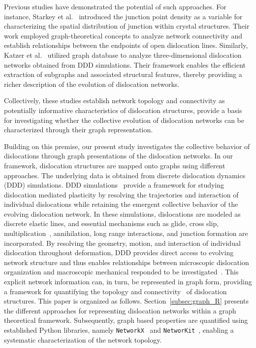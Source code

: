 \documentclass[pdflatex,sn-mathphys-num]{sn-jnl}%
\theoremstyle{thmstyleone}%
\theoremstyle{thmstyletwo}%
\theoremstyle{thmstylethree}%
\begin{document}
Previous studies have demonstrated the potential of such approaches. For instance, Starkey et al.~\cite{STARKEY2022} introduced the junction point density as a variable for characterizing the spatial distribution of junction within crystal structures. Their work employed graph-theoretical concepts to analyze network connectivity and establish relationships between the endpoints of open dislocation lines.
Similarly, Katzer et al.~\cite{KATZER2024115841} utilized graph database to analyze three-dimensional dislocation networks obtained from DDD simulations. Their framework enables the efficient extraction of subgraphs and associated structural features, thereby providing a richer description of the evolution of dislocation networks.

Collectively, these studies establish network topology and connectivity as potentially informative characteristics of dislocation structures, provide a basis for investigating whether the collective evolution of dislocation networks can be characterized through their graph representation. 

Building on this premise, our present study investigates the collective behavior of dislocations through graph presentations of the dislocation networks.
In our framework, dislocation structures are mapped onto graphs using different approaches.
The underlying data is obtained from discrete dislocation dynamics (DDD) simulations.
DDD simulations~\cite{kubin_1992, Van_der_Giessen_1995,  Ghoniem_2000, WEYGAND2005, D_Weygand_2002, ZBIB20021133,  Arsenlis_2007} provide a framework for studying dislocation mediated plasticity by resolving the trajectories and interaction of individual dislocations while retaining the emergent collective behavior of the evolving dislocation network.
In these simulations, dislocations are modeled as discrete elastic lines, and essential mechanisms such as glide, cross slip, multiplication~\cite{STRICKER2018319, SUDMANNS2019, Akhondzadeh2021SlipFree}, annihilation, long range interactions, and junction formation are incorporated.
By resolving the geometry, motion, and interaction of individual dislocation throughout deformation, DDD provides direct access to evolving network structure and thus enables relationships between microscopic dislocation organization and macroscopic mechanical responded to be investigated~\cite{Fan2021}.
This explicit network information can, in turn, be represented in graph form, providing a framework for quantifying the topology and connectivity~\cite{AKHONDZADEH2026connectivity, BERTIN2024119884} of dislocation structures.
This paper is organized as follows. Section~\ref{subsec:graph_R} presents the different approaches for representing dislocation networks within a graph theoretical framework. Subsequently, graph based properties are quantified using established Python libraries, namely \texttt{NetworkX}~\cite{NetworkX} and \texttt{NetworKit}~\cite{staudt2015networkit}, enabling a systematic characterization of the network topology.
\end{document}
